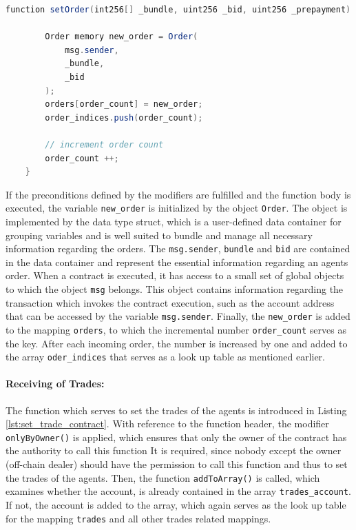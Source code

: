 \begin{lstlisting}[float=htbp, label=lst:set_order_contract, caption=Receiving of Orders from Agents, language=Java]
    function setOrder(int256[] _bundle, uint256 _bid, uint256 _prepayment) public payable checkPrepayment(_prepayment) {

        Order memory new_order = Order(
            msg.sender,
            _bundle,
            _bid
        );
        orders[order_count] = new_order;
        order_indices.push(order_count);

        // increment order count
        order_count ++;
    }
\end{lstlisting}

If the preconditions defined by the modifiers are fulfilled and the function body is executed, 
the variable \verb|new_order| is initialized by the object \verb|Order|. The object is implemented by the data type
struct, which is a user-defined data container for grouping variables and is well suited to bundle and 
manage all necessary information regarding the orders. The \verb|msg.sender|, \verb|bundle| and \verb|bid|
are contained in the data container and represent the essential information regarding an agents order.
When a contract is executed, it has access to a small set of global objects to which the object \verb|msg| belongs.
This object contains information regarding the transaction which invokes the contract execution,
such as the account address that can be accessed by the variable \verb|msg.sender|.
Finally, the \verb|new_order| is added to the mapping \verb|orders|, to which 
the incremental number \verb|order_count| serves as the key.
After each incoming order, the number is increased by one and added to the array \verb|oder_indices|
that serves as a look up table as mentioned earlier.

\paragraph{Receiving of Trades:} The function which serves to set the trades of the agents is introduced in Listing \ref{lst:set_trade_contract}.
With reference to the function header, the modifier \verb|onlyByOwner()| is applied, which ensures that
only the owner of the contract has the authority to call this function
It is required, since nobody except the owner (off-chain dealer) should have 
the permission to call this function and thus to set the trades of the agents.
Then, the function \verb|addToArray()| is called, which examines whether the account, 
is already contained in the array \verb|trades_account|.
If not, the account is added to the array, which again serves as the look up table for the
mapping \verb|trades| and all other trades related mappings. 

